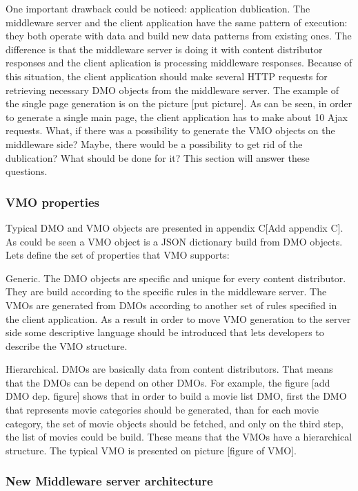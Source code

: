 One important drawback could be noticed: application dublication. The middleware server and the client application have the same pattern of execution: they both operate with data and build new data patterns from existing ones. The difference is that the middleware server is doing it with content distributor responses and the client aplication is processing middleware responses. Because of this situation, the client application should make several HTTP requests for retrieving necessary DMO objects from the middleware server.  The example of the single page generation is on the picture [put picture]. As can be seen, in order to generate a single main page, the client application has to make about 10 Ajax requests. What, if there was a possibility to generate the VMO objects on the middleware side?  Maybe, there would be a possibility to get rid of the dublication? What should be done for it? This section will answer these questions.

\subsubsection{VMO properties}


Typical DMO and VMO objects are presented in appendix C[Add appendix C]. As could be seen a VMO object is a JSON dictionary build from DMO objects. Lets define the set of properties that VMO supports:

Generic. The DMO objects are specific and unique for every content distributor. They are build according to the specific rules in the middleware server. The VMOs are generated from DMOs according to another set of rules specified in the client application. As a result in order to move VMO generation to the server side some descriptive language should be introduced that lets developers to describe the VMO structure.

Hierarchical. DMOs are basically data from content distributors. That means that the DMOs can be depend on other DMOs. For example, the figure [add DMO dep. figure] shows that in order to build a movie list DMO, first the DMO that represents movie categories should be generated, than for each movie category, the set of movie objects should be fetched, and only on the third step, the list of movies could be build. These means that the VMOs have a hierarchical structure. The typical VMO is presented on picture [figure of VMO]. 

\subsubsection{New Middleware server architecture}

